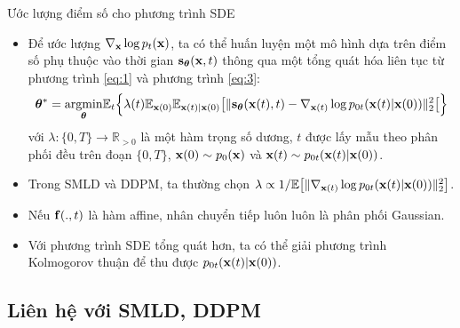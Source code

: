 \documentclass[10pt]{beamer}
\theoremstyle{remark}
\numberwithin{algocf}{section}
\numberwithin{equation}{section}
\numberwithin{dl}{section}
\numberwithin{figure}{section}
\begin{document}
\begin{frame}[shrink]{Ước lượng điểm số cho phương trình SDE}
	\begin{itemize}
		\item Để ước lượng $\nabla_{\bold{x}} \log p_t(\bold{x})$, ta có thể huấn luyện một mô hình dựa trên điểm số phụ thuộc vào thời gian $\bold{s}_{\boldsymbol{\theta}}(\bold{x}, t)$ thông qua một tổng quát hóa liên tục từ phương trình \ref{eq:1} và phương trình \ref{eq:3}:
		\begin{equation} \label{eq:7}
			\boldsymbol{\theta}^{\ast} = \underset{\boldsymbol{\theta}}{\mathrm{argmin}} \mathbb{E}_t \Big \lbrace  \lambda(t) \mathbb{E}_{\bold{x}(0)} \mathbb{E}_{\bold{x}(t) \vert \bold{x}(0)} \big \lbrack \lVert \bold{s}_{\boldsymbol{\theta}} (\bold{x}(t), t) - \nabla_{\bold{x}(t)} \log p_{0t} (\bold{x}(t) \vert \bold{x}(0)) \rVert_2^2 \big \lbrack \Big \rbrace
		\end{equation}
		với $\lambda: \lbrace 0, T \rbrace \rightarrow \mathbb{R}_{>0}$ là một hàm trọng số dương,
		$t$ được lấy mẫu theo phân phối đều trên đoạn $\lbrace 0, T \rbrace$, $\bold{x}(0) \sim p_0 (\bold{x})$ và $\bold{x}(t) \sim p_{0t} (\bold{x}(t) \vert \bold{x}(0))$.
		\item Trong SMLD và DDPM, ta thường chọn $\lambda \propto 1 / \mathbb{E} \big \lbrack \lVert \nabla_{\bold{x}(t)} \log p_{0t} (\bold{x}(t) \vert \bold{x}(0)) \rVert_2^2 \big \rbrack$.
		\item Nếu $\bold{f}(.,t)$ là hàm affine, nhân chuyển tiếp luôn luôn là phân phối Gaussian.
		\item Với phương trình SDE tổng quát hơn, ta có thể giải phương trình Kolmogorov thuận \citep{oksendal2003stochastic} để thu được $p_{0t} (\bold{x}(t) \vert \bold{x}(0))$.
	\end{itemize}
\end{frame}

\subsection{Liên hệ với SMLD, DDPM}
\end{document}
